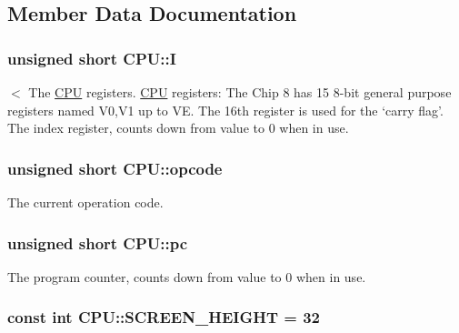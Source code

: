 \subsection{Member Data Documentation}
\hypertarget{classCPU_adf1fd15edb984e81a9f7adda264aa77a}{
\subsubsection[{I}]{\setlength{\rightskip}{0pt plus 5cm}unsigned short C\-P\-U\-::\-I\hspace{0.3cm}{\ttfamily [private]}}}\label{classCPU_adf1fd15edb984e81a9f7adda264aa77a}
$<$ The \hyperlink{classCPU}{C\-P\-U} registers. \hyperlink{classCPU}{C\-P\-U} registers\-: The Chip 8 has 15 8-\/bit general purpose registers named V0,V1 up to V\-E. The 16th register is used for the ‘carry flag’. The index register, counts down from value to 0 when in use. \hypertarget{classCPU_a494cb1c2ba6ce16e3a900eaf7b1a5f63}{
\subsubsection[{opcode}]{\setlength{\rightskip}{0pt plus 5cm}unsigned short C\-P\-U\-::opcode\hspace{0.3cm}{\ttfamily [private]}}}\label{classCPU_a494cb1c2ba6ce16e3a900eaf7b1a5f63}
The current operation code. \hypertarget{classCPU_a7ebf891c17b973e7aa4b1c2164dcab53}{
\subsubsection[{pc}]{\setlength{\rightskip}{0pt plus 5cm}unsigned short C\-P\-U\-::pc\hspace{0.3cm}{\ttfamily [private]}}}\label{classCPU_a7ebf891c17b973e7aa4b1c2164dcab53}
The program counter, counts down from value to 0 when in use. \hypertarget{classCPU_a0c73376f8f7ed2cdcdc97967433e23b7}{
\subsubsection[{S\-C\-R\-E\-E\-N\-\_\-\-H\-E\-I\-G\-H\-T}]{\setlength{\rightskip}{0pt plus 5cm}const int C\-P\-U\-::\-S\-C\-R\-E\-E\-N\-\_\-\-H\-E\-I\-G\-H\-T = 32\hspace{0.3cm}{\ttfamily [static]}}}\label{classCPU_a0c73376f8f7ed2cdcdc97967433e23b7}
